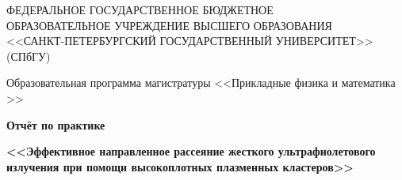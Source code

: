 \begin{titlepage}
    \begin{center} 
        
        

        \large{
           \MakeUppercase{Федеральное государственное бюджетное \\ образовательное учреждение высшего образования \\<<Санкт-Петербургский государственный университет>>} \\(СПбГУ)
        }

        \vfill

        Образовательная программа магистратуры <<Прикладные физика и математика >>

        \vfill

        \begin{figure}[h]
        \end{figure}

        

        \vfill

        
        {\Large \bfseries Отчёт по практике

        \Large \bfseries <<Эффективное направленное рассеяние жесткого ультрафиолетового
        излучения при помощи высокоплотных плазменных кластеров>>}



\end{center}
\end{titlepage}
